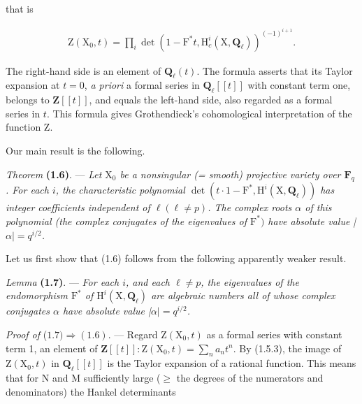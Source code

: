 \documentclass[10pt,leqno]{article}
\begin{document}
\noindent that is\par

\begin{equation*}\begin{gathered}\mathrm{Z}(\mathrm{X}_{0},t) = \prod _{i} \operatorname{det}(1- \mathrm{F}^{*}t, \mathrm{H}_{c}^{i}(\mathrm{X},\mathbf{Q}_{\ell }))^{(- 1)^{i+1}}.\end{gathered}\tag{1.5.4}\end{equation*}

\noindent The right-hand side is an element of \(\mathbf{Q}_{\ell }(t)\). The formula asserts that its Taylor expansion at \(t=0\), \emph{a priori} a formal series in \(\mathbf{Q}_{\ell }[[t]]\) with constant term one, belongs to \(\mathbf{Z}[[t]]\), and equals the left-hand side, also regarded as a formal series in \(t\). This formula gives Grothendieck’s cohomological interpretation of the function \(\mathrm{Z}\).\par

\noindent Our main result is the following.\par

\noindent \emph{Theorem} \textbf{(1.6)}. — {\itshape Let \(\mathrm{X}_{0}\) be a nonsingular (= smooth) projective variety over \(\mathbf{F}_{q}\). For each \(i\), the characteristic polynomial \(\operatorname{det}(t\cdot 1- \mathrm{F}^{*}, \mathrm{H}^{i}(\mathrm{X},\mathbf{Q}_{\ell }))\) has integer coefficients independent of \(\ell  (\ell \ne p)\). The complex roots \(\alpha \) of this polynomial (the complex conjugates of the eigenvalues of \(\mathrm{F}^{*})\) have absolute value |\(\alpha |=q^{i/2}\).}\par

\noindent Let us first show that (1.6) follows from the following apparently weaker result.\par

\noindent \emph{Lemma} \textbf{(1.7)}. — {\itshape For each \(i\), and each \(\ell \ne p\), the eigenvalues of the endomorphism \(\mathrm{F}^{*}\) of \(\mathrm{H}^{i}(\mathrm{X},\mathbf{Q}_{\ell })\) are algebraic numbers all of whose complex conjugates \(\alpha \) have absolute value |\(\alpha |=q^{i/2}\).}\par

\noindent \emph{Proof of} (\(1.7) \Rightarrow  (1.6)\). — Regard \(\mathrm{Z}(\mathrm{X}_{0},t)\) as a formal series with constant term 1, an element of \(\mathbf{Z}[[t]] : \mathrm{Z}(\mathrm{X}_{0},t)=\sum _{n} a_{n} t^{n}\). By (1.5.3), the image of \(\mathrm{Z}(\mathrm{X}_{0},t)\) in \(\mathbf{Q}_{\ell }[[t]]\) is the Taylor expansion of a rational function. This means that for \(\mathrm{N}\) and \(\mathrm{M}\) sufficiently large (\(\geq \) the degrees of the numerators and denominators) the Hankel determinants\par
\end{document}

